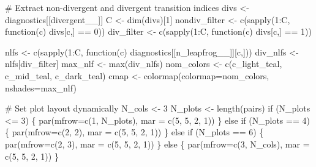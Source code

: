 \documentclass[
  letterpaper,
  DIV=11,
  numbers=noendperiod]{scrartcl}
\newenvironment{Shaded}{\begin{snugshade}}{\end{snugshade}}
\newcommand{\BuiltInTok}[1]{\textcolor[rgb]{0.00,0.23,0.31}{#1}}
\newcommand{\CommentTok}[1]{\textcolor[rgb]{0.37,0.37,0.37}{#1}}
\newcommand{\ControlFlowTok}[1]{\textcolor[rgb]{0.00,0.23,0.31}{#1}}
\newcommand{\DecValTok}[1]{\textcolor[rgb]{0.68,0.00,0.00}{#1}}
\newcommand{\NormalTok}[1]{\textcolor[rgb]{0.00,0.23,0.31}{#1}}
\newcommand{\OperatorTok}[1]{\textcolor[rgb]{0.37,0.37,0.37}{#1}}
\newcommand{\StringTok}[1]{\textcolor[rgb]{0.13,0.47,0.30}{#1}}
\begin{document}
\begin{Shaded}
\begin{Highlighting}[]
  \CommentTok{\# Extract non{-}divergent and divergent transition indices}
\NormalTok{  divs }\OperatorTok{\textless{}{-}}\NormalTok{ diagnostics[[}\StringTok{\textquotesingle{}divergent\_\_\textquotesingle{}}\NormalTok{]]}
\NormalTok{  C }\OperatorTok{\textless{}{-}}\NormalTok{ dim(divs)[}\DecValTok{1}\NormalTok{]}
\NormalTok{  nondiv\_filter }\OperatorTok{\textless{}{-}}\NormalTok{ c(sapply(}\DecValTok{1}\NormalTok{:C, function(c) divs[c,] }\OperatorTok{==} \DecValTok{0}\NormalTok{))}
\NormalTok{  div\_filter    }\OperatorTok{\textless{}{-}}\NormalTok{ c(sapply(}\DecValTok{1}\NormalTok{:C, function(c) divs[c,] }\OperatorTok{==} \DecValTok{1}\NormalTok{))}
  
\NormalTok{  nlfs }\OperatorTok{\textless{}{-}}\NormalTok{ c(sapply(}\DecValTok{1}\NormalTok{:C, }
\NormalTok{                   function(c) diagnostics[[}\StringTok{\textquotesingle{}n\_leapfrog\_\_\textquotesingle{}}\NormalTok{]][c,]))}
\NormalTok{  div\_nlfs }\OperatorTok{\textless{}{-}}\NormalTok{ nlfs[div\_filter]}
\NormalTok{  max\_nlf }\OperatorTok{\textless{}{-}} \BuiltInTok{max}\NormalTok{(div\_nlfs)}
\NormalTok{  nom\_colors }\OperatorTok{\textless{}{-}}\NormalTok{ c(c\_light\_teal, c\_mid\_teal, c\_dark\_teal)}
\NormalTok{  cmap }\OperatorTok{\textless{}{-}}\NormalTok{ colormap(colormap}\OperatorTok{=}\NormalTok{nom\_colors, nshades}\OperatorTok{=}\NormalTok{max\_nlf)}
  
  \CommentTok{\# Set plot layout dynamically}
\NormalTok{  N\_cols }\OperatorTok{\textless{}{-}} \DecValTok{3}
\NormalTok{  N\_plots }\OperatorTok{\textless{}{-}}\NormalTok{ length(pairs)}
  \ControlFlowTok{if}\NormalTok{ (N\_plots }\OperatorTok{\textless{}=} \DecValTok{3}\NormalTok{) \{}
\NormalTok{    par(mfrow}\OperatorTok{=}\NormalTok{c(}\DecValTok{1}\NormalTok{, N\_plots), mar }\OperatorTok{=}\NormalTok{ c(}\DecValTok{5}\NormalTok{, }\DecValTok{5}\NormalTok{, }\DecValTok{2}\NormalTok{, }\DecValTok{1}\NormalTok{))}
\NormalTok{  \} }\ControlFlowTok{else} \ControlFlowTok{if}\NormalTok{ (N\_plots }\OperatorTok{==} \DecValTok{4}\NormalTok{) \{}
\NormalTok{    par(mfrow}\OperatorTok{=}\NormalTok{c(}\DecValTok{2}\NormalTok{, }\DecValTok{2}\NormalTok{), mar }\OperatorTok{=}\NormalTok{ c(}\DecValTok{5}\NormalTok{, }\DecValTok{5}\NormalTok{, }\DecValTok{2}\NormalTok{, }\DecValTok{1}\NormalTok{))}
\NormalTok{  \} }\ControlFlowTok{else} \ControlFlowTok{if}\NormalTok{ (N\_plots }\OperatorTok{==} \DecValTok{6}\NormalTok{) \{}
\NormalTok{    par(mfrow}\OperatorTok{=}\NormalTok{c(}\DecValTok{2}\NormalTok{, }\DecValTok{3}\NormalTok{), mar }\OperatorTok{=}\NormalTok{ c(}\DecValTok{5}\NormalTok{, }\DecValTok{5}\NormalTok{, }\DecValTok{2}\NormalTok{, }\DecValTok{1}\NormalTok{))}
\NormalTok{  \} }\ControlFlowTok{else}\NormalTok{ \{}
\NormalTok{    par(mfrow}\OperatorTok{=}\NormalTok{c(}\DecValTok{3}\NormalTok{, N\_cols), mar }\OperatorTok{=}\NormalTok{ c(}\DecValTok{5}\NormalTok{, }\DecValTok{5}\NormalTok{, }\DecValTok{2}\NormalTok{, }\DecValTok{1}\NormalTok{))}
\NormalTok{  \}}
  

\end{Highlighting}
\end{Shaded}
\end{document}
